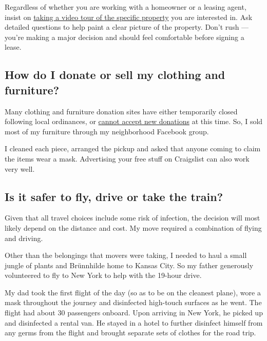 Regardless of whether you are working with a homeowner or a leasing
agent, insist on
\href{https://www.nytimes.com/2020/05/30/realestate/virtual-tours-renting.html}{taking
a video tour of the specific property} you are interested in. Ask
detailed questions to help paint a clear picture of the property. Don't
rush --- you're making a major decision and should feel comfortable
before signing a lease.

\hypertarget{how-do-i-donate-or-sell-my-clothing-and-furniture}{%
\subsection{How do I donate or sell my clothing and
furniture?}\label{how-do-i-donate-or-sell-my-clothing-and-furniture}}

Many clothing and furniture donation sites have either temporarily
closed following local ordinances, or
\href{https://www.nytimes.com/2020/04/13/style/self-care/donate-clothes-coronavirus.html}{cannot
accept new donations} at this time. So, I sold most of my furniture
through my neighborhood Facebook group.

I cleaned each piece, arranged the pickup and asked that anyone coming
to claim the items wear a mask. Advertising your free stuff on
Craigslist can also work very well.

\hypertarget{is-it-safer-to-fly-drive-or-take-the-train}{%
\subsection{Is it safer to fly, drive or take the
train?}\label{is-it-safer-to-fly-drive-or-take-the-train}}

Given that all travel choices include some risk of infection, the
decision will most likely depend on the distance and cost. My move
required a combination of flying and driving.

Other than the belongings that movers were taking, I needed to haul a
small jungle of plants and Brünnhilde home to Kansas City. So my father
generously volunteered to fly to New York to help with the 19-hour
drive.

My dad took the first flight of the day (so as to be on the cleanest
plane), wore a mask throughout the journey and disinfected high-touch
surfaces as he went. The flight had about 30 passengers onboard. Upon
arriving in New York, he picked up and disinfected a rental van. He
stayed in a hotel to further disinfect himself from any germs from the
flight and brought separate sets of clothes for the road trip.

